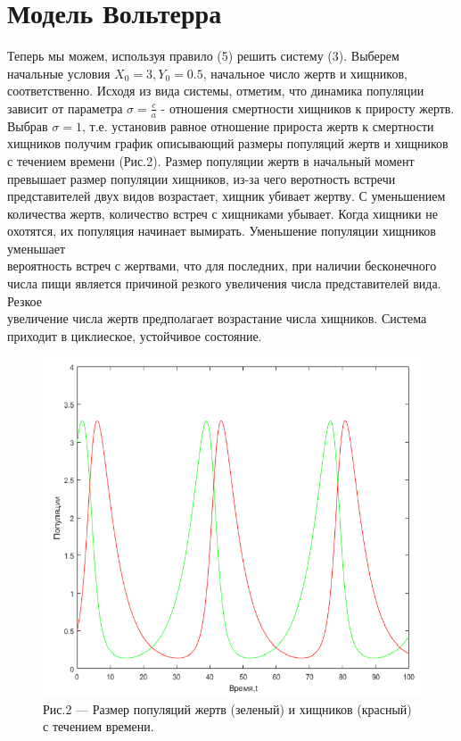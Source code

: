 \documentclass[a4paper,12pt]{article}
\begin{document}
\section{Модель Вольтерра}
\hspace{0.5cm} Теперь мы можем, используя правило (5) решить систему (3). Выберем начальные условия
$X_0 = 3, Y_0 = 0.5$, начальное число жертв и хищников, соответственно. Исходя из вида системы, отметим, что
динамика популяции зависит от параметра $\sigma = \frac{c}{a}$ - отношения смертности хищников к приросту жертв.
Выбрав $\sigma = 1$, т.е. установив равное отношение прироста жертв к смертности хищников получим график 
описывающий размеры популяций жертв и хищников с течением времени (Рис.2). Размер популяции жертв 
в начальный момент превышает размер популяции хищников, из-за чего веротность встречи представителей двух
видов возрастает, хищник убивает жертву. С уменьшением количества жертв, количество встреч 
с хищниками убывает. Когда хищники не охотятся, их популяция начинает вымирать. Уменьшение популяции хищников уменьшает \\
вероятность встреч с жертвами, что для последних, при наличии бесконечного числа пищи 
является причиной резкого увеличения числа представителей вида. Резкое \\
увеличение числа жертв предполагает возрастание числа хищников. Система приходит в циклиеское, устойчивое состояние. 
\begin{figure}[h]
    \centering
    \includegraphics[width=0.5\linewidth]{pictures/task1.png}
    \captionsetup{labelformat=empty}
    \caption{Рис.2 --- Размер популяций жертв (зеленый) и хищников (красный) с течением времени.}
\end{figure}
\newpage
\end{document}
